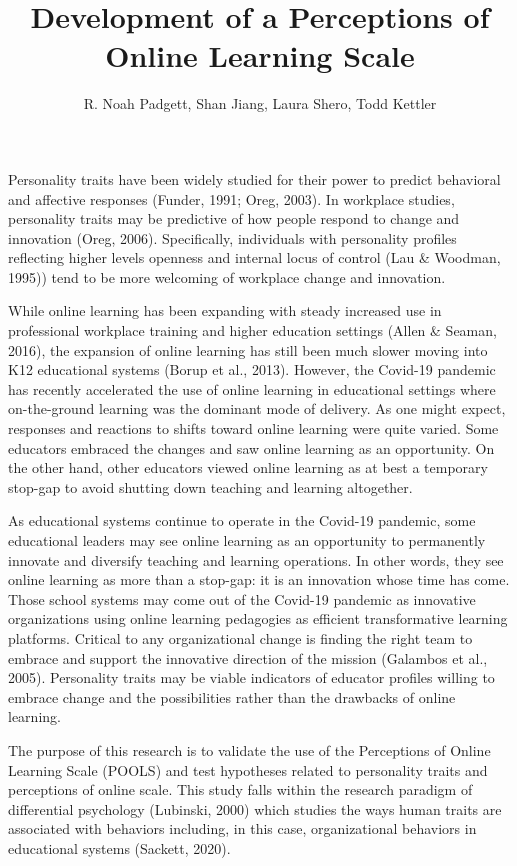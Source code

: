 \documentclass[man, noextraspace, floatsintext, 12pt]{apa7}
\title{Development of a Perceptions of Online Learning Scale}
\author{R. Noah Padgett, Shan Jiang, Laura Shero, Todd Kettler}
\begin{document}
\maketitle

Personality traits have been widely studied for their power to predict behavioral and affective responses (Funder, 1991; Oreg, 2003). In workplace studies, personality traits may be predictive of how people respond to change and innovation (Oreg, 2006). Specifically, individuals with personality profiles reflecting higher levels openness and internal locus of control (Lau \& Woodman, 1995)) tend to be more welcoming of workplace change and innovation. 

While online learning has been expanding with steady increased use in professional workplace training and higher education settings (Allen \& Seaman, 2016), the expansion of online learning has still been much slower moving into K12 educational systems (Borup et al., 2013). However, the Covid-19 pandemic has recently accelerated the use of online learning in educational settings where on-the-ground learning was the dominant mode of delivery. As one might expect, responses and reactions to shifts toward online learning were quite varied. Some educators embraced the changes and saw online learning as an opportunity. On the other hand, other educators viewed online learning as at best a temporary stop-gap to avoid shutting down teaching and learning altogether. 

As educational systems continue to operate in the Covid-19 pandemic, some educational leaders may see online learning as an opportunity to permanently innovate and diversify teaching and learning operations. In other words, they see online learning as more than a stop-gap: it is an innovation whose time has come. Those school systems may come out of the Covid-19 pandemic as innovative organizations using online learning pedagogies as efficient transformative learning platforms. Critical to any organizational change is finding the right team to embrace and support the innovative direction of the mission (Galambos et al., 2005). Personality traits may be viable indicators of educator profiles willing to embrace change and the possibilities rather than the drawbacks of online learning. 

The purpose of this research is to validate the use of the Perceptions of Online Learning Scale (POOLS) and test hypotheses related to personality traits and perceptions of online scale. This study falls within the research paradigm of differential psychology (Lubinski, 2000) which studies the ways human traits are associated with behaviors including, in this case, organizational behaviors in educational systems (Sackett, 2020). 
\end{document}
